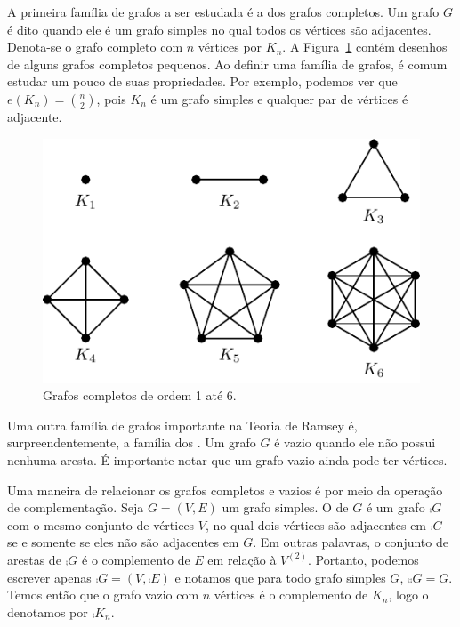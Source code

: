A primeira família de grafos a ser estudada é a dos grafos completos. Um grafo $G$ é dito   quando ele é um grafo simples no qual todos os vértices são adjacentes. Denota-se o grafo completo com $n$ vértices por $K_n$. A Figura~\ref{fig:intro:complete} contém desenhos de alguns grafos completos pequenos. Ao definir uma família de grafos, é comum estudar um pouco de suas propriedades. Por exemplo, podemos ver que $e(K_n) = \binom{n}{2}$, pois $K_n$ é um grafo simples e qualquer par de vértices é adjacente.

\begin{figure}[ht!]
\centering
\includegraphics{figures/1_intro_3_complete}
\caption{Grafos completos de ordem 1 até 6.}
\label{fig:intro:complete}
\end{figure}

Uma outra família de grafos importante na Teoria de Ramsey é, surpreendentemente, a família dos . Um grafo $G$ é vazio quando ele não possui nenhuma aresta. É importante notar que um grafo vazio ainda pode ter vértices.

Uma maneira de relacionar os grafos completos e vazios é por meio da operação de complementação. Seja $G = (V,E)$ um grafo simples. O  de $G$ é um grafo $\comp{G}$ com o mesmo conjunto de vértices $V$, no qual dois vértices são adjacentes em $\comp{G}$ se e somente se eles não são adjacentes em $G$. Em outras palavras, o conjunto de arestas de $\comp{G}$ é o complemento de $E$ em relação à $V^{(2)}$. Portanto, podemos escrever apenas $\comp{G} = (V,\comp{E})$ e notamos que para todo grafo simples $G$, $\comp{\comp{G}} = G$.
Temos então que o grafo vazio com $n$ vértices é o complemento de $K_n$, logo o denotamos por $\comp{K_n}$.

